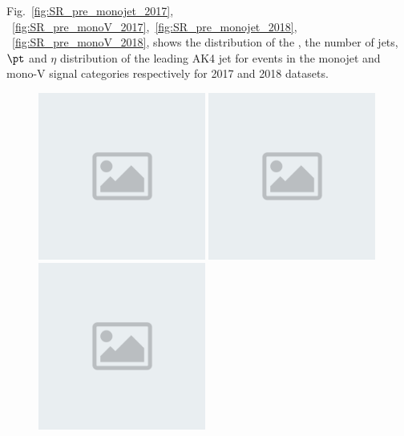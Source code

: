 Fig.~\ref{fig:SR_pre_monojet_2017}, ~\ref{fig:SR_pre_monoV_2017},~\ref{fig:SR_pre_monojet_2018}, ~\ref{fig:SR_pre_monoV_2018},
shows the distribution of the \ETmiss, the number of
jets, $\pt$ and $\eta$ distribution of the leading AK4 jet for events
in the monojet and mono-V signal categories respectively for 2017 and 2018 datasets.

\begin{figure}[htbp]
    \begin{center}
        \includegraphics[width=0.49\textwidth]{placeholder.png}
        \includegraphics[width=0.49\textwidth]{placeholder.png} \\
        \includegraphics[width=0.49\textwidth]{placeholder.png}

\end{center}
\end{figure}
